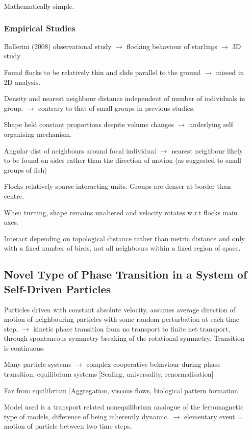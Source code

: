 \documentclass[10pt,twocolumn]{revtex4-2}    %
\begin{document}
Mathematically simple.


\subsubsection{Empirical Studies}

Ballerini (2008) observational study $\rightarrow$ flocking behaviour of starlings $\rightarrow$ 3D study

Found flocks to be relatively thin and slide parallel to the ground $\rightarrow$ missed in 2D analysis.

Density and nearest neighbour distance independent of number of individuals in group. $\rightarrow$ contrary to that of small groups in previous studies.

Shape held constant proportions despite volume changes $\rightarrow$ underlying self organising mechanism. 

Angular dist of neighbours around focal individual $\rightarrow$ nearest neighbour likely to be found on sides rather than the direction of motion (as suggested to small groups of fish)

Flocks relatively sparse interacting units. Groups are denser at border than centre. 

When turning, shape remains unaltered and velocity rotates w.r.t flocks main axes. 

Interact depending on topological distance rather than metric distance and only with a fixed number of birds, not all neighbours within a fixed region of space.


\subsection{Novel Type of Phase Transition in a System of Self-Driven Particles}

Particles driven with constant absolute velocity, assumes average direction of motion of neighbouring particles with some random perturbation at each time step. $\rightarrow$ kinetic phase transition from no transport to finite net transport, through spontaneous symmetry breaking of the rotational symmetry. Transition is continuous. 

Many particle systems $\rightarrow$ complex cooperative behaviour during phase transition. equilibrium systems [Scaling, universality, renormalisation] 

Far from equilibrium [Aggregation, viscous flows, biological pattern formation]

Model used is a transport related nonequilibrium analogue of the ferromagnetic type of models, difference of being inherently dynamic. $\rightarrow$ elementary event = motion of particle between two time steps. 
\end{document}

